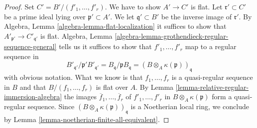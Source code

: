 \documentclass[10pt,a4paper]{amsart}
\theoremstyle{plain}
\theoremstyle{definition}
\theoremstyle{remark}
\numberwithin{equation}{subsection}
\begin{document}
\begin{proof}
Set $C' = B'/(f'_1, \ldots, f'_r)$. We have to show $A' \to C'$ is flat.
Let $\mathfrak r' \subset C'$ be a prime ideal lying over
$\mathfrak p' \subset A'$. We let $\mathfrak q' \subset B'$
be the inverse image of $\mathfrak r'$.
By Algebra, Lemma \ref{algebra-lemma-flat-localization}
it suffices to show that $A'_{\mathfrak p'} \to C'_{\mathfrak q'}$ is flat.
Algebra, Lemma \ref{algebra-lemma-grothendieck-regular-sequence-general}
tells us it suffices to show that $f'_1, \ldots, f'_r$ map to
a regular sequence in
$$
B'_{\mathfrak q'}/\mathfrak p'B'_{\mathfrak q'} =
B_\mathfrak q/\mathfrak p B_\mathfrak q =
(B \otimes_A \kappa(\mathfrak p))_\mathfrak q
$$
with obvious notation. What we know is that $f_1, \ldots, f_r$
is a quasi-regular sequence in $B$ and that $B/(f_1, \ldots, f_r)$
is flat over $A$. By Lemma \ref{lemma-relative-regular-immersion-algebra}
the images $\overline{f}_1, \ldots, \overline{f}_r$
of $f'_1, \ldots, f'_r$ in $B \otimes_A \kappa(\mathfrak p)$ form a
quasi-regular sequence. Since $(B \otimes_A \kappa(\mathfrak p))_\mathfrak q$
is a Noetherian local ring, we conclude by Lemma
\ref{lemma-noetherian-finite-all-equivalent}.
\end{proof}
\end{document}
